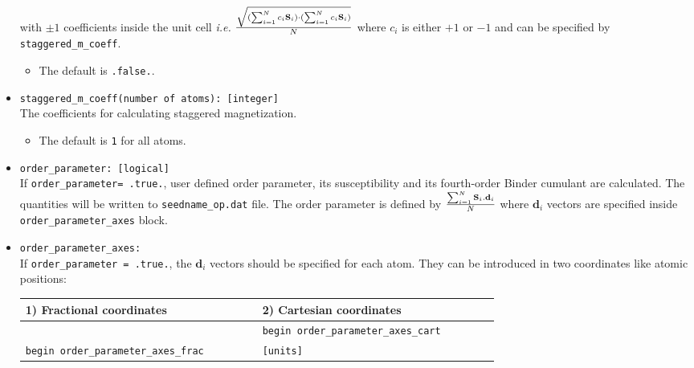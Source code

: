 \documentclass[10pt]{report}
\def\la{\large}
\begin{document}
\begin{itemize}
with $\pm 1$ coefficients inside the unit cell {\it i.e.} 
$\frac{\sqrt{(\sum_{i=1}^{N}c_i {\textbf S}_i)\cdot(\sum_{i=1}^{N}c_i {\textbf S}_i)}}{N}$ where $c_i$ 
is either $+1$ or $-1$ and can be specified by {\tt staggered\_m\_coeff}.  
\begin{itemize} [label=\adfhalfrightarrowhead]
\item The default is {\tt .false.}.
\end{itemize}
\item {\tt staggered\_m\_coeff(number of atoms): [integer]}             \\
The coefficients for calculating staggered magnetization.
\begin{itemize} [label=\adfhalfrightarrowhead]
\item The default is {\tt 1} for all atoms.
\end{itemize}
\item {\tt order\_parameter: [logical]}                  \\
If {\tt order\_parameter= .true.}, user defined order parameter, its susceptibility and
its fourth-order Binder cumulant are calculated.
The quantities will be written to {\tt seedname\_op.dat} file. 
 The order parameter is defined by $\frac{\sum_{i=1}^{N}{\textbf S}_i.\textbf{d}_i}{N}$ 
where $\textbf{d}_i$ vectors are specified inside {\tt order\_parameter\_axes} block.
\item {\tt order\_parameter\_axes: }  \\
If {\tt order\_parameter = .true.}, the $\textbf{d}_i$ vectors should be specified for each atom.
They can be introduced in two coordinates like atomic positions:
\begin{center}
    \begin{tabular}{p{0.4\linewidth}p{0.4\linewidth}}
        \toprule
        \multicolumn{1}{l}{\la 1) Fractional coordinates} & \multicolumn{1}{l}{\la 2) Cartesian coordinates} \\ \midrule
                                 & {\tt begin order\_parameter\_axes\_cart} \\
         {\tt begin order\_parameter\_axes\_frac} & {\tt [units]}                   \\

\end{tabular}
\end{center}
\end{itemize}
\end{document}
